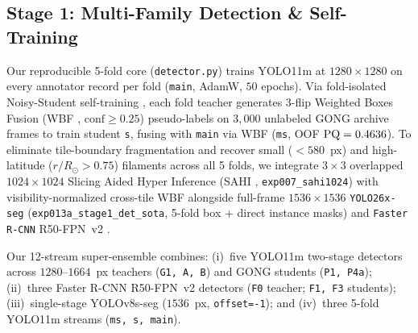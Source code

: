 \documentclass[sigconf]{acmart}
\begin{document}
\subsection{Stage 1: Multi-Family Detection \& Self-Training}
Our reproducible 5-fold core (\texttt{detector.py}) trains YOLO11m \cite{yolo11} at $1280\times 1280$ on every annotator record per fold (\texttt{main}, AdamW, $50$ epochs). Via fold-isolated Noisy-Student self-training \cite{xie2020self,lee2013pseudo}, each fold teacher generates 3-flip Weighted Boxes Fusion (WBF \cite{solovyev2021weighted}, $\mathrm{conf}\ge 0.25$) pseudo-labels on $3{,}000$ unlabeled GONG archive frames to train student \texttt{s}, fusing with \texttt{main} via WBF (\texttt{ms}, OOF $\mathrm{PQ}=0.4636$). To eliminate tile-boundary fragmentation and recover small ($<580$~px) and high-latitude ($r/R_\odot > 0.75$) filaments across all 5 folds, we integrate $3\times 3$ overlapped $1024\times 1024$ Slicing Aided Hyper Inference (SAHI \cite{akyon2022sahi}, \texttt{exp007\_\allowbreak sahi1024}) with visibility-normalized cross-tile WBF alongside full-frame $1536\times 1536$ \texttt{YOLO26x-seg} \cite{jocher2023ultralytics} (\texttt{exp013a\_\allowbreak stage1\_\allowbreak det\_\allowbreak sota}, 5-fold box + direct instance masks) and \texttt{Faster R-CNN} R50-FPN~v2 \cite{ren2015faster,he2016deep}.

Our 12-stream super-ensemble combines: (i)~five YOLO11m two-stage detectors across $1280\text{--}1664$~px teachers (\texttt{G1, A, B}) and GONG students (\texttt{P1, P4a}); (ii)~three Faster R-CNN R50-FPN~v2 detectors (\texttt{F0} teacher; \texttt{F1, F3} students); (iii)~single-stage YOLOv8s-seg ($1536$~px, \texttt{offset=-1}); and (iv)~three 5-fold YOLO11m streams (\texttt{ms, s, main}).
\end{document}

